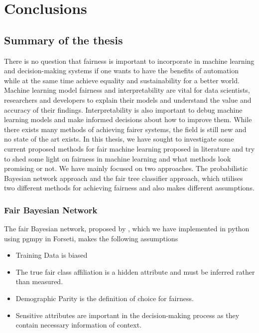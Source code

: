 \chapter{Conclusions}
\label{ch:conclusion}

\section{Summary of the thesis}

There is no question that fairness is important to incorporate in machine learning and decision-making systems if one wants to have the benefits of automation while at the same time achieve equality and sustainability for a better world. Machine learning model fairness and interpretability are vital for data scientists, researchers and developers to explain their models and understand the value and accuracy of their findings. Interpretability is also important to debug machine learning models and make informed decisions about how to improve them. While there exists many methods of achieving fairer systems, the field is still new and no state of the art exists. In this thesis, we have sought to investigate some current proposed methods for fair machine learning proposed in literature and try to shed some light on fairness in machine learning and what methods look promising or not. We have mainly focused on two approaches. The probabilistic Bayesian network approach and the fair tree classifier approach, which utilises two different methods for achieving fairness and also makes different assumptions. 

\subsection{Fair Bayesian Network}

The fair Bayesian network, proposed by \citet{Choi:2021:AIII}, which we have implemented in python using pgmpy in Forseti, makes the following assumptions

\begin{itemize}
    \item Training Data is biased
    \item The true fair class affiliation is a hidden attribute and must be inferred rather than measured.
    \item Demographic Parity is the definition of choice for fairness.
    \item Sensitive attributes are important in the decision-making process as they contain necessary information of context.
\end{itemize}

